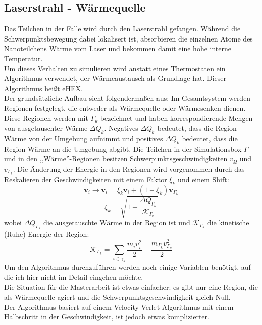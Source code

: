 \documentclass[12pt]{article}
\begin{document}
\subsection{Laserstrahl - Wärmequelle}
Das Teilchen in der Falle wird durch den Laserstrahl gefangen. Während die Schwerpunktsbewegung dabei lokalisert ist, absorbieren
die einzelnen Atome des Nanoteilchens Wärme vom Laser und bekommen damit eine hohe interne Temperatur.\\
Um dieses Verhalten zu simulieren wird anstatt eines Thermostaten ein Algorithmus verwendet, der Wärmeaustausch als Grundlage hat.
Dieser Algorithmus heißt eHEX.\\
Der grundsätzliche Aufbau sieht folgendermaßen aus: Im Gesamtsystem werden Regionen festgelegt, die entweder als Wärmequelle oder 
Wärmesenken dienen. Diese Regionen werden mit $\Gamma_k$ bezeichnet und haben korrespondierende Mengen von ausgetauschter Wärme $\Delta Q_k$. 
Negatives $\Delta Q_k$ bedeutet, dass die Region Wärme von der Umgebung aufnimmt und positives $\Delta Q_k$ bedeutet, dass die Region 
Wärme an die Umgebung abgibt. Die Teilchen in der Simulationsbox $\Gamma$ und in den ,,Wärme''-Regionen besitzen 
Schwerpunktsgeschwindigkeiten $v_\Omega$ und $v_{\Gamma_k}$. Die Änderung der Energie in den Regionen wird vorgenommen durch das Reskalieren 
der Geschwindigkeiten mit einem Faktor $\xi_k$ und einem Shift:
\begin{equation}
    \mathbf{v}_i \rightarrow \mathbf{\bar{v}}_i = \xi_k \mathbf{v}_i + (1-\xi_k)\mathbf{v}_{\Gamma_k}
\end{equation}
\begin{equation}
    \xi_k = \sqrt{1+\frac{\Delta Q_{\Gamma_k}}{\mathcal{K}_{\Gamma_k}}}
\end{equation}
wobei $\Delta Q_{\Gamma_k}$ die ausgetauschte Wärme in der Region ist und $\mathcal{K}_{\Gamma_k}$ die kinetische (Ruhe)-Energie der Region:
\begin{equation}
    \label{eq:kineticK}
    \mathcal{K}_{\Gamma_k} = \sum_{i \in \gamma_k} \frac{m_i v_i^2}{2} - \frac{m_{\Gamma_k}v_{\Gamma_k}^2}{2}
\end{equation}
Um den Algorithmus durchzuführen werden noch einige Variablen benötigt, auf die ich hier nicht im Detail eingehen möchte.\\
Die Situation für die Masterarbeit ist etwas einfacher: es gibt nur eine Region, die als Wärmequelle agiert und die
Schwerpunktsgeschwindigkeit gleich Null.\\
Der Algorithmus basiert auf einem Velocity-Verlet Algorithmus mit einem Halbschritt in der Geschwindigkeit, ist jedoch etwas komplizierter. 
\end{document}
